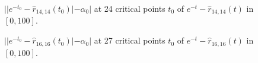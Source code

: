 \begin{figure}[!ht]
\centering
\resizebox{0.9\textwidth}{!}{}
\caption{$||e^{-t_0} - \hat{r}_{14,14}(t_0)| - \alpha_0|$ at 24 critical points
$t_0$ of $e^{-t} - \hat{r}_{14,14}(t)$ in $[0, 100]$.}
\label{fig:pusa-differences-errors-14}
\end{figure}

\begin{figure}[!ht]
\centering
\resizebox{0.9\textwidth}{!}{}
\caption{$||e^{-t_0} - \hat{r}_{16,16}(t_0)| - \alpha_0|$ at 27 critical points
$t_0$ of $e^{-t} - \hat{r}_{16,16}(t)$ in $[0, 100]$.}
\label{fig:pusa-differences-errors-16}
\end{figure}
